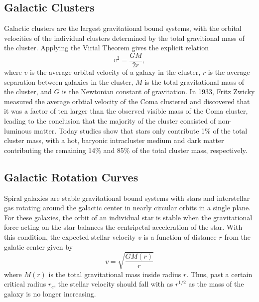 \subsection{Galactic Clusters}
\label{sec:dm_clusters}

Galactic clusters are the largest gravitational bound systems, with the orbital velocities of the individual clusters determined by the total gravitional mass of the cluster. Applying the Virial Theorem gives the explicit relation
\begin{equation}
  v^2 = \frac{GM}{2r},
\end{equation}
where $v$ is the average orbital velocity of a galaxy in the cluster, $r$ is the average separation between galaxies in the cluster, $M$ is the total gravitational mass of the cluster, and $G$ is the Newtonian constant of gravitation.
In 1933, Fritz Zwicky measured the average orbtial velocity of the Coma clustered and discovered that it was a factor of ten larger than the observed visible mass of the Coma cluster, leading to the conclusion that the majority of the cluster consisted of non-luminous matter.
Today studies show that stars only contribute 1\% of the total cluster mass, with a hot, baryonic intracluster medium and dark matter contributing the remaining 14\% and 85\% of the total cluster mass, respectively.

\subsection{Galactic Rotation Curves}
\label{sec:dm_curves}

Spiral galaxies are stable gravitational bound systems with stars and interstellar gas rotating around the galactic center in nearly circular orbits in a single plane.
For these galaxies, the orbit of an individual star is stable when the gravitational force acting on the star balances the centripetal acceleration of the star.
With this condition, the expected stellar velocity $v$ is a function of distance $r$ from the galatic center given by
\begin{equation}
  v = \sqrt{\frac{GM(r)}{r}}
\end{equation}
where $M(r)$ is the total gravitational mass inside radius $r$.
Thus, past a certain critical radius $r_c$, the stellar velocity should fall with as $r^{1/2}$ as the mass of the galaxy is no longer increasing.

